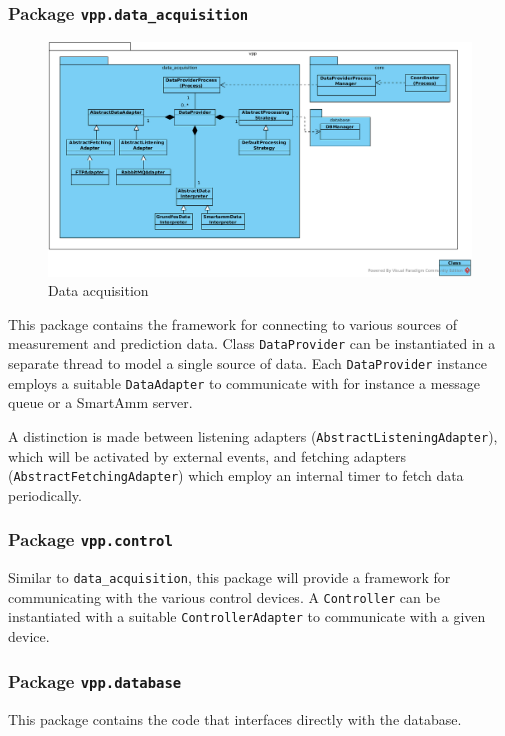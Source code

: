 \subsubsection{Package \texttt{vpp.data\_acquisition}}

\begin{figure}[H]
    \centering
    \includegraphics[width=\textwidth]{figures/class_data_acquisition}
    \caption{Data acquisition}
    \label{figureClassDiagram}
\end{figure}

This package contains the framework for connecting to various sources of measurement and prediction data. Class \texttt{DataProvider} can be instantiated in a separate thread to model a single source of data. Each \texttt{DataProvider} instance employs a suitable \texttt{DataAdapter} to communicate with for instance a message queue or a SmartAmm server.

A distinction is made between listening adapters (\texttt{AbstractListeningAdapter}), which will be activated by external events, and fetching adapters (\texttt{AbstractFetchingAdapter}) which employ an internal timer to fetch data periodically.

\subsubsection{Package \texttt{vpp.control}}
Similar to \texttt{data\_acquisition}, this package will provide a framework for communicating with the various control devices. A \texttt{Controller} can be instantiated with a suitable \texttt{ControllerAdapter} to communicate with a given device. 


\subsubsection{Package \texttt{vpp.database}}
This package contains the code that interfaces directly with the database. 


